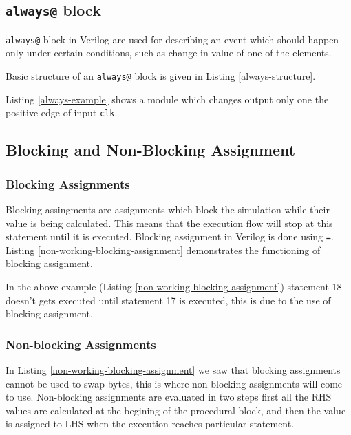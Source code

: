 \documentclass[a4paper,10pt]{article}
\theoremstyle{mytheor}
\newcommand{
  \insertverilog}[3]{
  
}
\begin{document}
\insertverilog{./verilog_files/initialStructure.v}{initial-structure}{Structure of an initial block.} 

\subsection{\lstinline[style=verilog-inline-style]{always@} block}
\lstinline[style=verilog-inline-style]{always@} block in Verilog are
used for describing an event which should happen only under certain
conditions, such as change in value of one of the elements.
 
Basic structure of an \lstinline[style=verilog-inline-style]{always@}
block is given in Listing \ref{always-structure}.

\insertverilog{./verilog_files/alwaysStructure.v}{always-structure}{Structure of an always@ block.} 

Listing \ref{always-example} shows a module which changes output only
one the positive edge of input
\lstinline[style=verilog-inline-style]{clk}. 

\insertverilog{./verilog_files/alwaysExample.v}{always-example}{Synchronous logic which changes value of result only at the positive edge of clk.} 
 
\subsection{Blocking and Non-Blocking Assignment}
\subsubsection{Blocking Assignments}
Blocking assingments are assignments which block the simulation while
their value is being calculated. This means that the execution flow
will stop at this statement until it is executed. Blocking assignment
in Verilog is done using
\lstinline[style=verilog-inline-style]{=}. Listing
\ref{non-working-blocking-assignment} demonstrates the functioning of
blocking assignment.

\insertverilog{./verilog_files/nonWorkingSwap.v}{non-working-blocking-assignment}{Swapping bytes using blocking assignment.}  

In the above example (Listing \ref{non-working-blocking-assignment})
statement 18 doesn't gets executed until statement 17 is executed,
this is due to the use of blocking assignment.

\subsubsection{Non-blocking Assignments} 
In Listing \ref{non-working-blocking-assignment} we saw that blocking
assignments cannot be used to swap bytes, this is where non-blocking
assignments will come to use. Non-blocking assignments are evaluated
in two steps first all the RHS values are calculated at the begining
of the procedural block, and then the value is assigned to LHS when
the execution reaches particular statement.
\end{document}
